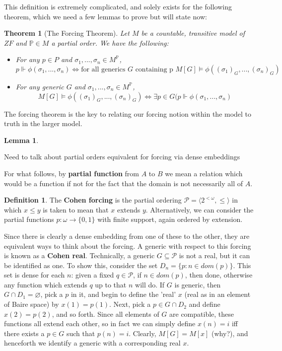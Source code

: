 \documentclass{article}
\theoremstyle{definition}
\newtheorem{definition}{Definition}[section]
\theoremstyle{plain}
\theoremstyle{theorem}
\newtheorem{lemma}{Lemma}[section]
\newtheorem{theorem}{Theorem}[section]
\begin{document}
This definition is extremely complicated, and solely exists for the following theorem, which we need a few lemmas to prove but will state now:
\begin{theorem}[The Forcing Theorem]
	Let $M$ be a countable, transitive model of $ZF$ and $\mathbb{P} \in M$ a partial order. We have the following:
	\begin{itemize}
		\item[(1)]
			For any $p \in P$ and $\sigma_1,...,\sigma_n \in M^{\mathbb{P}}$,
			\[ p \Vdash \phi(\sigma_1,...,\sigma_n) \iff \textrm{for all generics }G \textrm{ containing p }M[G] \models \phi((\sigma_1)_G,...,(\sigma_n)_G)  \]
		\item[(2)]
			For any generic $G$ and $\sigma_1,...,\sigma_n \in M^{\mathbb{P}}$, 
			\[ M[G] \models \phi((\sigma_1)_G,...,(\sigma_n)_G) \iff \exists p \in G (p \Vdash \phi(\sigma_1,...,\sigma_n) \]
	\end{itemize}
\end{theorem}
The forcing theorem is the key to relating our forcing notion within the model to truth in the larger model.
\begin{lemma}
\end{lemma}
Need to talk about partial orders equivalent for forcing via dense embeddings \par
For what follows, by \textbf{partial function} from $A$ to $B$ we mean a relation which would be a function if not for the fact that the domain is not necessarily all of $A$.  
\begin{definition}
	The \textbf{Cohen forcing} is the partial ordering $\mathcal{P} = \langle 2^{<\omega},\leq \rangle$ in which $x \leq y$ is taken to mean that $x$ extends $y$. Alternatively, we can consider the partial functions $p:\omega \to \{0,1\}$ with finite support, again ordered by extension. 
\end{definition}
Since there is clearly a dense embedding from one of these to the other, they are equivalent ways to think about the forcing. A generic with respect to this forcing is known as a \textbf{Cohen real}. Technically, a generic $G \subseteq \mathcal{P}$ is not a real, but it can be identified as one. To show this, consider the set $D_n = \{p: n \in dom(p)\}$. This set is dense for each $n$: given a fixed $q \in \mathcal{P}$, if $n \in dom(p)$, then done, otherwise any function which extends $q$ up to that $n$ will do. If $G$ is generic, then $G \cap D_1 = \varnothing$, pick a $p$ in it, and begin to define the 'real' $x$ (real as in an element of Baire space) by $x(1) = p(1)$. Next, pick a $p \in G \cap D_2$ and define $x(2) = p(2)$, and so forth. Since all elements of $G$ are compatible, these functions all extend each other, so in fact we can simply define $x(n) = i$ iff there exists a $p \in G$ such that $p(n) = i$. Clearly, $M[G] = M[x]$ (why?), and henceforth we identify a generic with a corresponding real $x$. \par 
\end{document}
